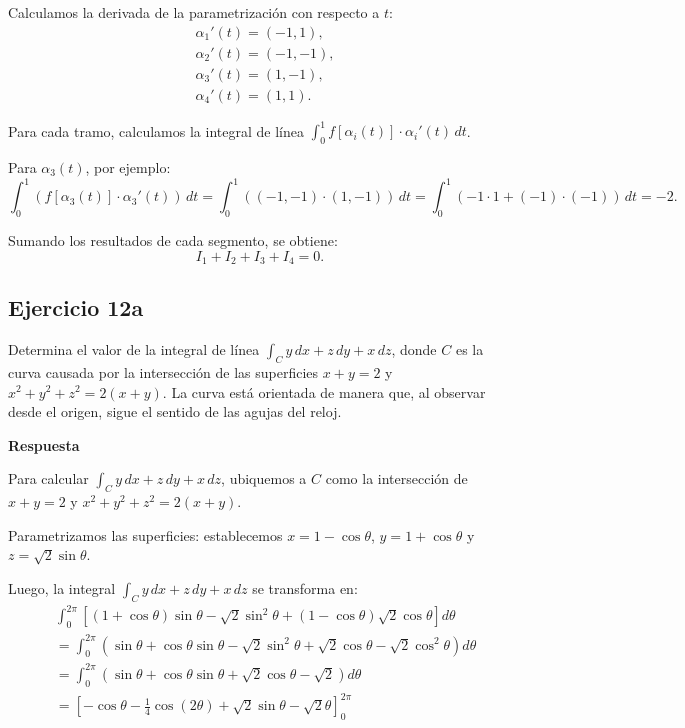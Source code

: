 \documentclass{report}
\begin{document}
Calculamos la derivada de la parametrización con respecto a \(t\):
\[
\begin{aligned}
& \alpha_1'(t) = (-1, 1), \\
& \alpha_2'(t) = (-1, -1), \\
& \alpha_3'(t) = (1, -1), \\
& \alpha_4'(t) = (1, 1).
\end{aligned}
\]

Para cada tramo, calculamos la integral de línea \(\int_0^1 f[\alpha_i(t)] \cdot \alpha_i'(t) \, dt\).

Para \(\alpha_3(t)\), por ejemplo:
\[
\int_0^1 \left( f[\alpha_3(t)] \cdot \alpha_3'(t) \right) \, dt = \int_0^1 \left( (-1, -1) \cdot (1, -1) \right) \, dt = \int_0^1 (-1 \cdot 1 + (-1) \cdot (-1)) \, dt = -2.
\]

Sumando los resultados de cada segmento, se obtiene:
\[
I_1 + I_2 + I_3 + I_4 = 0.
\]

\subsection*{Ejercicio 12a}
Determina el valor de la integral de línea \(\int_{C} y \, dx + z \, dy + x \, dz\), donde \(C\) es la curva causada por la intersección de las superficies \(x + y = 2\) y \(x^{2} + y^{2} + z^{2} = 2(x + y)\). La curva está orientada de manera que, al observar desde el origen, sigue el sentido de las agujas del reloj.

\textbf{Respuesta}

Para calcular \(\int_{C} y \, dx + z \, dy + x \, dz\), ubiquemos a \(C\) como la intersección de \(x + y = 2\) y \(x^{2} + y^{2} + z^{2} = 2(x + y)\).

Parametrizamos las superficies: establecemos \(x = 1 - \cos \theta\), \(y = 1 + \cos \theta\) y \(z = \sqrt{2} \sin \theta\).

Luego, la integral \(\int_{C} y \, dx + z \, dy + x \, dz\) se transforma en:
$$
\begin{aligned}
& \int_{0}^{2 \pi} \left[(1 + \cos \theta) \sin \theta - \sqrt{2} \sin^2 \theta + (1 - \cos \theta) \sqrt{2} \cos \theta \right] d\theta \\
& = \int_{0}^{2 \pi} \left(\sin \theta + \cos \theta \sin \theta - \sqrt{2} \sin^2 \theta + \sqrt{2} \cos \theta - \sqrt{2} \cos^2 \theta \right) d\theta \\
& = \int_{0}^{2 \pi} \left(\sin \theta + \cos \theta \sin \theta + \sqrt{2} \cos \theta - \sqrt{2} \right) d\theta \\
& = \left[-\cos \theta - \frac{1}{4} \cos(2 \theta) + \sqrt{2} \sin \theta - \sqrt{2} \theta \right]_{0}^{2 \pi}
\end{aligned}
$$
\end{document}
